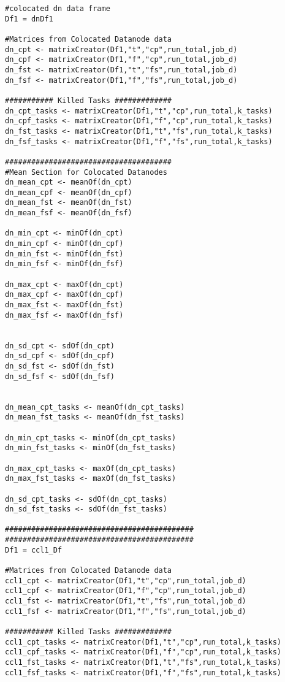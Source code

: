 \begin{verbatim}
#colocated dn data frame
Df1 = dnDf1

#Matrices from Colocated Datanode data
dn_cpt <- matrixCreator(Df1,"t","cp",run_total,job_d)
dn_cpf <- matrixCreator(Df1,"f","cp",run_total,job_d)
dn_fst <- matrixCreator(Df1,"t","fs",run_total,job_d)
dn_fsf <- matrixCreator(Df1,"f","fs",run_total,job_d)

########### Killed Tasks #############
dn_cpt_tasks <- matrixCreator(Df1,"t","cp",run_total,k_tasks)
dn_cpf_tasks <- matrixCreator(Df1,"f","cp",run_total,k_tasks)
dn_fst_tasks <- matrixCreator(Df1,"t","fs",run_total,k_tasks)
dn_fsf_tasks <- matrixCreator(Df1,"f","fs",run_total,k_tasks)

######################################
#Mean Section for Colocated Datanodes
dn_mean_cpt <- meanOf(dn_cpt)
dn_mean_cpf <- meanOf(dn_cpf)
dn_mean_fst <- meanOf(dn_fst)
dn_mean_fsf <- meanOf(dn_fsf)

dn_min_cpt <- minOf(dn_cpt)
dn_min_cpf <- minOf(dn_cpf)
dn_min_fst <- minOf(dn_fst)
dn_min_fsf <- minOf(dn_fsf)

dn_max_cpt <- maxOf(dn_cpt)
dn_max_cpf <- maxOf(dn_cpf)
dn_max_fst <- maxOf(dn_fst)
dn_max_fsf <- maxOf(dn_fsf)


dn_sd_cpt <- sdOf(dn_cpt)
dn_sd_cpf <- sdOf(dn_cpf)
dn_sd_fst <- sdOf(dn_fst)
dn_sd_fsf <- sdOf(dn_fsf)


dn_mean_cpt_tasks <- meanOf(dn_cpt_tasks)
dn_mean_fst_tasks <- meanOf(dn_fst_tasks)

dn_min_cpt_tasks <- minOf(dn_cpt_tasks)
dn_min_fst_tasks <- minOf(dn_fst_tasks)

dn_max_cpt_tasks <- maxOf(dn_cpt_tasks)
dn_max_fst_tasks <- maxOf(dn_fst_tasks)

dn_sd_cpt_tasks <- sdOf(dn_cpt_tasks)
dn_sd_fst_tasks <- sdOf(dn_fst_tasks)

###########################################
###########################################
Df1 = ccl1_Df

#Matrices from Colocated Datanode data
ccl1_cpt <- matrixCreator(Df1,"t","cp",run_total,job_d)
ccl1_cpf <- matrixCreator(Df1,"f","cp",run_total,job_d)
ccl1_fst <- matrixCreator(Df1,"t","fs",run_total,job_d)
ccl1_fsf <- matrixCreator(Df1,"f","fs",run_total,job_d)

########### Killed Tasks #############
ccl1_cpt_tasks <- matrixCreator(Df1,"t","cp",run_total,k_tasks)
ccl1_cpf_tasks <- matrixCreator(Df1,"f","cp",run_total,k_tasks)
ccl1_fst_tasks <- matrixCreator(Df1,"t","fs",run_total,k_tasks)
ccl1_fsf_tasks <- matrixCreator(Df1,"f","fs",run_total,k_tasks)


\end{verbatim}
